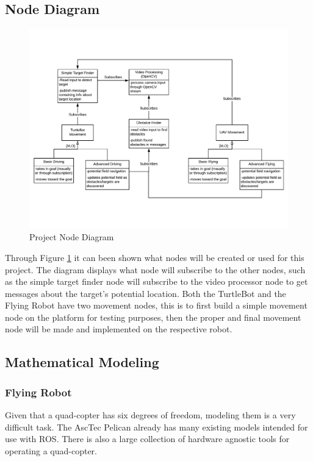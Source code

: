 \documentclass{article}
\begin{document}
	\subsection{Node Diagram}

	\begin{figure}[H]
		\centering
		\includegraphics[width=0.9\linewidth]{NodeDiagram}
		\caption{Project Node Diagram}
		\label{fig:nodediagram}
	\end{figure}


	Through Figure \ref{fig:nodediagram} it can been shown what nodes will be created or used for this project. The diagram displays what node will subscribe to the other nodes, such as the simple target finder node will subscribe to the video processor node to get messages about the target's potential location. Both the TurtleBot and the Flying Robot have two movement nodes, this is to first build a simple movement node on the platform for testing purposes, then the proper and final movement node will be made and implemented on the respective robot. 

	
	\subsection{Mathematical Modeling}
	
		\subsubsection{Flying Robot}
	
		Given that a quad-copter has six degrees of freedom, modeling them is a very difficult task. The AscTec Pelican already has many existing models intended for use with ROS. There is also a large collection of hardware agnostic tools for operating a quad-copter.
	
\end{document}
